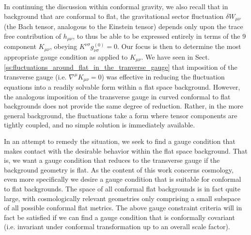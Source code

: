 In continuing the discussion within conformal gravity, we also recall that in background that are conformal to flat, the gravitational sector fluctuation $\delta W_{\mu\nu}$ (the Bach tensor, analogous to the Einstein tensor) depends only upon the trace free contribution of $h_{\mu\nu}$, to thus be able to be expressed entirely in terms of the 9 component $K_{\mu\nu}$, obeying $K^{\nu\sigma}g^{(0)}_{\nu\sigma}=0$. Our focus is then to determine the most appropriate gauge condition as applied to $K_{\mu\nu}$. We have seen in Sect. \ref{ss:fluctuations_around_flat_in_the_tranverse_gauge} that imposition of the transverse gauge (i.e. $\nabla^\mu K_{\mu\nu} = 0$) was effective in reducing the fluctuation equations into a readily solvable form within a flat space background. However, the analogous imposition of the transverse gauge in curved conformal to flat backgrounds does not provide the same degree of reduction. Rather, in the more general background, the fluctuations take a form where tensor components are tightly coupled, and no simple solution is immediately available. 

In an attempt to remedy the situation, we seek to find a gauge condition that makes contact with the desirable behavior within the flat space background. That is, we want a gauge condition that reduces to the transverse gauge if the background geometry is flat. As the content of this work concerns cosmology, even more specifically we desire a gauge condition that is suitable for conformal to flat backgrounds. The space of all conformal flat backgrounds is in fact quite large, with cosmologically relevant geometries only comprising a small subspace of all possible conformal flat metrics. The above gauge constraint criteria will in fact be satisfied if we can find a gauge condition that is conformally covariant (i.e. invariant under conformal transformation up to an overall scale factor). 

